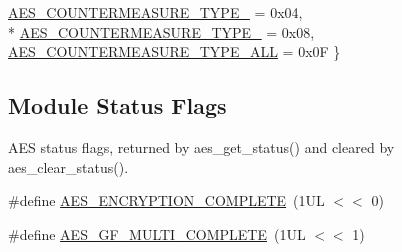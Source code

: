 \begin{DoxyCompactItemize}
\hyperlink{group__asfdoc__sam0__drivers__aes__group_gga1e219f13a55ca81c4ef0576d4993d29fa99f06dd7eab2949eda7b725430d3abef}{A\+E\+S\+\_\+\+C\+O\+U\+N\+T\+E\+R\+M\+E\+A\+S\+U\+R\+E\+\_\+\+T\+Y\+P\+E\+\_} = 0x04, 
\\*
\hyperlink{group__asfdoc__sam0__drivers__aes__group_gga1e219f13a55ca81c4ef0576d4993d29faee42a8c13c82564d674b1d8a8d017691}{A\+E\+S\+\_\+\+C\+O\+U\+N\+T\+E\+R\+M\+E\+A\+S\+U\+R\+E\+\_\+\+T\+Y\+P\+E\+\_} = 0x08, 
\hyperlink{group__asfdoc__sam0__drivers__aes__group_gga1e219f13a55ca81c4ef0576d4993d29fa3344d51b5dc79729c03c84a9aa66824a}{A\+E\+S\+\_\+\+C\+O\+U\+N\+T\+E\+R\+M\+E\+A\+S\+U\+R\+E\+\_\+\+T\+Y\+P\+E\+\_\+\+A\+L\+L} = 0x0\+F
 \}
\end{DoxyCompactItemize}
\subsection*{Module Status Flags}
\label{_amgrpdd98d5e8b9a5fd30d323c8eeeab117f4}%
A\+E\+S status flags, returned by aes\+\_\+get\+\_\+status() and cleared by aes\+\_\+clear\+\_\+status(). \begin{DoxyCompactItemize}
\item 
\#define \hyperlink{group__asfdoc__sam0__drivers__aes__group_ga4bede6c9fbc7ad0a60b8a0f72e07b45e}{A\+E\+S\+\_\+\+E\+N\+C\+R\+Y\+P\+T\+I\+O\+N\+\_\+\+C\+O\+M\+P\+L\+E\+T\+E}~(1\+U\+L $<$$<$ 0)
\item 
\#define \hyperlink{group__asfdoc__sam0__drivers__aes__group_gae9507d6496a34ddfec7d0aedec331129}{A\+E\+S\+\_\+\+G\+F\+\_\+\+M\+U\+L\+T\+I\+\_\+\+C\+O\+M\+P\+L\+E\+T\+E}~(1\+U\+L $<$$<$ 1)
\end{DoxyCompactItemize}
